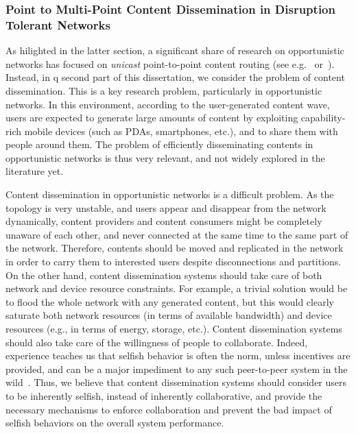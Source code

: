 \subsubsection{Point to Multi-Point Content Dissemination in Disruption Tolerant Networks}

As hilighted in the latter section, a significant share of research on opportunistic networks has focused on \emph{unicast} point-to-point content routing (see e.g.~\cite{DTNTaxonomy} or~\cite{Passarella:Survey}). Instead, in q second part of this dissertation, we consider the problem of content dissemination. This is a key research problem, 
particularly in opportunistic networks. In this environment, according to the user-generated content wave, users are expected to generate large amounts of content 
by exploiting capability-rich mobile devices (such as PDAs, smartphones, etc.), and to share them with people around them.  The problem of efficiently disseminating contents in opportunistic networks is thus very relevant, and not widely explored in the literature yet.
 
Content dissemination in opportunistic networks is a difficult problem. As the topology is very unstable, and users appear and disappear from the network dynamically, content providers and content consumers might be completely unaware of each other, and never connected at the same 
time to the same part of the network. Therefore, contents should be moved and replicated in the network in order to carry them to interested users despite disconnections 
and partitions. On the other hand, content dissemination systems should take care of both network and device resource constraints.
For example, a trivial solution would be to flood the whole network with any generated content, but this would clearly saturate both network resources (in terms of available bandwidth) and device resources (e.g., in terms of energy, storage, etc.). Content dissemination systems should also take care of the willingness of people to collaborate. Indeed,  
experience teaches us that selfish behavior is often the norm, unless incentives are provided, and can be a major impediment to any such peer-to-peer system in the wild~\cite{NashEquilibria}. Thus, we believe that content dissemination systems should consider users to be inherently selfish, instead of inherently collaborative, and provide the necessary mechanisms to enforce collaboration and prevent the bad impact of selfish behaviors on the overall system performance.  

